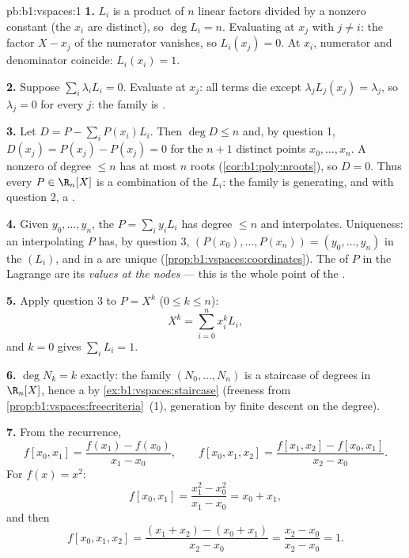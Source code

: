 \begin{solution}{pb:b1:vspaces:1}
\textbf{1.} $L_i$ is a product of $n$ linear factors divided by a
nonzero constant (the $x_i$ are distinct), so $\deg L_i = n$.
Evaluating at $x_j$ with $j \neq i$: the factor $X - x_j$ of the
numerator vanishes, so $L_i(x_j) = 0$. At $x_i$, numerator and
denominator coincide: $L_i(x_i) = 1$.

\textbf{2.} Suppose $\sum_i \lambda_i L_i = 0$. Evaluate at $x_j$:
all terms die except $\lambda_j L_j(x_j) = \lambda_j$, so
$\lambda_j = 0$ for every $j$: the family is .

\textbf{3.} Let $D = P - \sum_i P(x_i) L_i$. Then $\deg D \leq n$
and, by question 1, $D(x_j) = P(x_j) - P(x_j) = 0$ for the $n + 1$
distinct points $x_0, \dots, x_n$. A nonzero  of degree
$\leq n$ has at most $n$ roots (\cref{cor:b1:poly:nroots}), so $D
= 0$. Thus every $P \in \R_n[X]$ is a combination of the $L_i$:
the family is generating, and with question 2, a .

\textbf{4.} Given $y_0, \dots, y_n$, the  $P = \sum_i
y_i L_i$ has degree $\leq n$ and interpolates. Uniqueness: an
interpolating $P$ has, by question 3,  $(P(x_0), \dots,
P(x_n)) = (y_0, \dots, y_n)$ in the  $(L_i)$, and 
in a  are unique (\cref{prop:b1:vspaces:coordinates}). The
 of $P$ in the Lagrange  are its \emph{values at
the nodes} --- this is the whole point of the .

\textbf{5.} Apply question 3 to $P = X^k$ ($0 \leq k \leq n$):
\[
X^k = \sum_{i=0}^{n} x_i^{k} L_i ,
\]
and $k = 0$ gives $\sum_i L_i = 1$.

\textbf{6.} $\deg N_k = k$ exactly: the family $(N_0, \dots, N_n)$
is a staircase of degrees in $\R_n[X]$, hence a  by
\cref{ex:b1:vspaces:staircase} (freeness from
\cref{prop:b1:vspaces:freecriteria}~(1), generation by finite
descent on the degree).

\textbf{7.} From the recurrence,
\[
f[x_0, x_1] = \frac{f(x_1) - f(x_0)}{x_1 - x_0},
\qquad
f[x_0, x_1, x_2] = \frac{f[x_1, x_2] - f[x_0, x_1]}{x_2 - x_0}.
\]
For $f(x) = x^2$:
\[
f[x_0, x_1] = \frac{x_1^2 - x_0^2}{x_1 - x_0} = x_0 + x_1,
\]
and then
\[
f[x_0, x_1, x_2]
= \frac{(x_1 + x_2) - (x_0 + x_1)}{x_2 - x_0}
= \frac{x_2 - x_0}{x_2 - x_0} = 1 .
\]


\end{solution}
